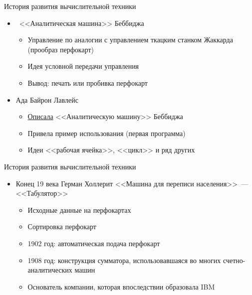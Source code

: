 \documentclass[aspectratio=169,14pt]{beamer}
\begin{document}
\begin{frame}{История развития вычислительной техники}
    \begin{itemize}
        \item ~<<Аналитическая машина>> Беббиджа
        \begin{itemize}
            \item Управление по аналогии с управлением ткацким станком
            Жаккарда (прообраз перфокарт)
            \item Идея условной передачи управления
            \item Вывод: печать или пробивка перфокарт
        \end{itemize}
        \item Ада Байрон Лавлейс
        \begin{itemize}
            \item \href{https://habr.com/ru/company/wolfram/blog/303552/}{Описала} <<Аналитическую машину>> Беббиджа
            \item Привела пример использования (первая программа)
            \item Идеи <<рабочая ячейка>>, <<цикл>> и ряд других
        \end{itemize}
    \end{itemize}
\end{frame}

\begin{frame}{История развития вычислительной техники}
    \begin{itemize}
        \item Конец 19 века Герман Холлерит <<Машина для переписи населения>>~--- <<Табулятор>>
        \begin{itemize}
            \item Исходные данные на перфокартах
            \item Сортировка перфокарт
            \item 1902 год: автоматическая подача перфокарт
            \item 1908 год: конструкция сумматора, использовавшаяся во многих
            счетно-аналитических машин
            \item Основатель компании, которая впоследствии образовала IBM
        \end{itemize}
    \end{itemize}
\end{frame}
\end{document}
